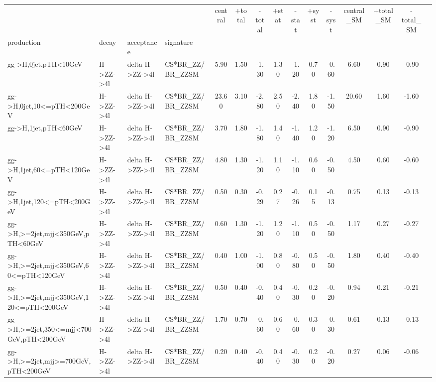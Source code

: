 \begin{tabular}{l|l|l|l|c|c|c|c|c|c|c|c|c|c|c}
\toprule
 &  &  &  & central & +total & -total & +stat & -stat & +syst & -syst & central\_SM & +total\_SM & -total\_SM \\
production & decay & acceptance & signature &  &  &  &  &  &  &  &  &  &  \\
\midrule
gg->H,0jet,pTH<10GeV & H->ZZ->4l & delta H->ZZ->4l & CS*BR\_ZZ/BR\_ZZSM & 5.90 & 1.50 & -1.30 & 1.30 & -1.20 & 0.70 & -0.60 & 6.60 & 0.90 & -0.90 \\
\cline{1-14}
gg->H,0jet,10<=pTH<200GeV & H->ZZ->4l & delta H->ZZ->4l & CS*BR\_ZZ/BR\_ZZSM & 23.60 & 3.10 & -2.80 & 2.50 & -2.40 & 1.80 & -1.50 & 20.60 & 1.60 & -1.60 \\
\cline{1-14}
gg->H,1jet,pTH<60GeV & H->ZZ->4l & delta H->ZZ->4l & CS*BR\_ZZ/BR\_ZZSM & 3.70 & 1.80 & -1.80 & 1.40 & -1.40 & 1.20 & -1.20 & 6.50 & 0.90 & -0.90 \\
\cline{1-14}
gg->H,1jet,60<=pTH<120GeV & H->ZZ->4l & delta H->ZZ->4l & CS*BR\_ZZ/BR\_ZZSM & 4.80 & 1.30 & -1.20 & 1.10 & -1.10 & 0.60 & -0.50 & 4.50 & 0.60 & -0.60 \\
\cline{1-14}
gg->H,1jet,120<=pTH<200GeV & H->ZZ->4l & delta H->ZZ->4l & CS*BR\_ZZ/BR\_ZZSM & 0.50 & 0.30 & -0.29 & 0.27 & -0.26 & 0.15 & -0.13 & 0.75 & 0.13 & -0.13 \\
\cline{1-14}
gg->H,>=2jet,mjj<350GeV,pTH<60GeV & H->ZZ->4l & delta H->ZZ->4l & CS*BR\_ZZ/BR\_ZZSM & 0.60 & 1.30 & -1.20 & 1.20 & -1.10 & 0.50 & -0.50 & 1.17 & 0.27 & -0.27 \\
\cline{1-14}
gg->H,>=2jet,mjj<350GeV,60<=pTH<120GeV & H->ZZ->4l & delta H->ZZ->4l & CS*BR\_ZZ/BR\_ZZSM & 0.40 & 1.00 & -1.00 & 0.80 & -0.80 & 0.50 & -0.50 & 1.80 & 0.40 & -0.40 \\
\cline{1-14}
gg->H,>=2jet,mjj<350GeV,120<=pTH<200GeV & H->ZZ->4l & delta H->ZZ->4l & CS*BR\_ZZ/BR\_ZZSM & 0.50 & 0.40 & -0.40 & 0.40 & -0.30 & 0.20 & -0.20 & 0.94 & 0.21 & -0.21 \\
\cline{1-14}
gg->H,>=2jet,350<=mjj<700GeV,pTH<200GeV & H->ZZ->4l & delta H->ZZ->4l & CS*BR\_ZZ/BR\_ZZSM & 1.70 & 0.70 & -0.60 & 0.60 & -0.60 & 0.30 & -0.30 & 0.61 & 0.13 & -0.13 \\
\cline{1-14}
gg->H,>=2jet,mjj>=700GeV,pTH<200GeV & H->ZZ->4l & delta H->ZZ->4l & CS*BR\_ZZ/BR\_ZZSM & 0.20 & 0.40 & -0.40 & 0.40 & -0.30 & 0.20 & -0.20 & 0.27 & 0.06 & -0.06 \\
\end{tabular}
